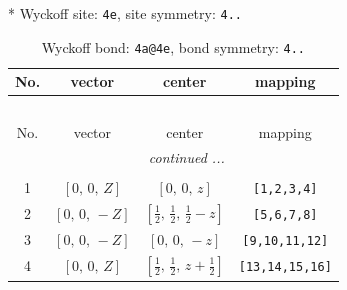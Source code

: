 \documentclass[fleqn,8pt]{jsarticle}
\begin{document}
* Wyckoff site: {\tt 4e}, site symmetry: {\tt 4..}
\renewcommand{\arraystretch}{1.2}
\begin{longtable}{cccc}
\caption{Wyckoff bond: {\tt 4a@4e}, bond symmetry: {\tt 4..}}
 \\
 \hline \hline
No. & vector & center & mapping \\ \hline \endfirsthead

\multicolumn{3}{l}{\tablename\ \thetable{}} \\
 \hline \hline
No. & vector & center & mapping \\ \hline \endhead

 \hline \hline
\multicolumn{3}{r}{\footnotesize\it continued ...} \\ \endfoot

 \hline \hline
\multicolumn{3}{r}{} \\ \endlastfoot

1 & $\left[ 0,\, 0,\, Z \right]$ & $\left[ 0,\, 0,\, z \right]$ & {\tt [1,2,3,4]} \\ \hline
2 & $\left[ 0,\, 0,\, - Z \right]$ & $\left[ \frac{1}{2},\, \frac{1}{2},\, \frac{1}{2} - z \right]$ & {\tt [5,6,7,8]} \\ \hline
3 & $\left[ 0,\, 0,\, - Z \right]$ & $\left[ 0,\, 0,\, - z \right]$ & {\tt [9,10,11,12]} \\ \hline
4 & $\left[ 0,\, 0,\, Z \right]$ & $\left[ \frac{1}{2},\, \frac{1}{2},\, z + \frac{1}{2} \right]$ & {\tt [13,14,15,16]} \\
\end{longtable}
\renewcommand{\arraystretch}{1.2}
\end{document}
